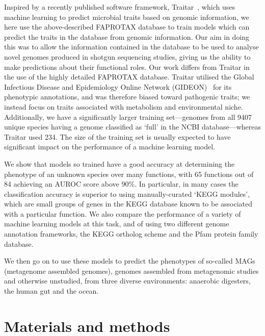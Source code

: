\documentclass[10pt,letterpaper]{article}
\begin{document}
Inspired by a recently published software framework, Traitar~\cite{Weimann2016}, which uses machine learning to predict microbial traits based on genomic information, we here use the above-described FAPROTAX database to train models which can predict the traits in the database from genomic information. Our aim in doing this was to allow the information contained in the database to be used to analyse novel genomes produced in shotgun sequencing studies, giving us the ability to make predictions about their functional roles. Our work differs from Traitar in the use of the highly detailed FAPROTAX database. Traitar utilised the Global Infectious Disease and Epidemiology Online Network (GIDEON)~\cite{Berger2005} for its phenotypic annotations, and was therefore biased toward pathogenic traits; we instead focus on traits associated with metabolism and environmental niche. Additionally, we have a significantly larger training set---genomes from all 9407 unique species having a genome classified as `full' in the NCBI database---whereas Traitar used 234. The size of the training set is usually expected to have significant impact on the performance of a machine learning model.

We show that models so trained have a good accuracy at determining the phenotype of an unknown species over many functions, with 65 functions out of 84 achieving an AUROC score above 90\%. In particular, in many cases the classification accuracy is superior to using manually-curated `KEGG modules', which are small groups of genes in the KEGG database known to be associated with a particular function. We also compare the performance of a variety of machine learning models at this task, and of using two different genome annotation frameworks, the KEGG ortholog scheme and the Pfam protein family database. 

We then go on to use these models to predict the phenotypes of so-called MAGs (metagenome assembled genomes), genomes assembled from metagenomic studies and otherwise unstudied, from three diverse environments: anaerobic digesters, the human gut and the ocean.  


\section*{Materials and methods}
\end{document}
